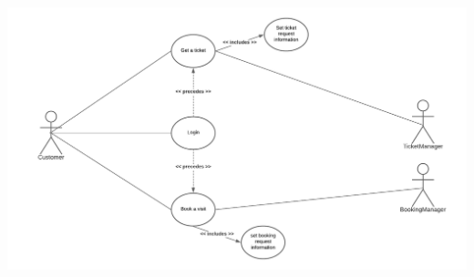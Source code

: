 \documentclass[a4paper, 10pt, oneside]{article}
\begin{document}
\begin{minipage}{\linewidth}
        \centering
           \includegraphics[height=0.4\textheight, scale=0.1, keepaspectratio]{img/book_ticket_use_diagram.png}
        \end{minipage}
\end{document}
